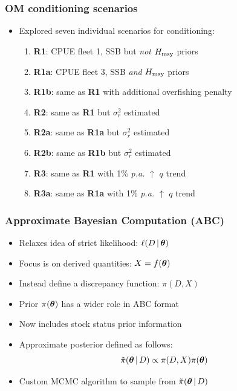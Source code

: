 \documentclass{beamer}
\newcommand{\ds}{\displaystyle}
\newcommand{\xtheta}{\mbox{\boldmath$\theta$}}
\newcommand{\sigr}{\sigma^2_r}
\newcommand{\hmsy}{H_{\rm msy}}
\begin{document}
\begin{frame}
\frametitle{OM conditioning scenarios}
\begin{itemize}
  \item Explored seven individual scenarios for conditioning:
  \vspace{0.25cm}
  \begin{enumerate}
      \item \textbf{R1}: CPUE fleet 1, SSB but \emph{not} $\hmsy$ priors
      \item \textbf{R1a}: CPUE fleet 3, SSB \emph{and} $\hmsy$ priors 
      \item \textbf{R1b}: same as \textbf{R1} with additional overfishing penalty
      \item \textbf{R2}: same as \textbf{R1} but $\sigr$ estimated
      \item \textbf{R2a}: same as \textbf{R1a} but $\sigr$ estimated 
      \item \textbf{R2b}: same as \textbf{R1b} but $\sigr$ estimated 
      \item \textbf{R3}: same as \textbf{R1} with 1\% \textit{p.a.} $\uparrow$ $q$ trend
      \item \textbf{R3a}: same as \textbf{R1a} with 1\% \textit{p.a.} $\uparrow$ $q$ trend
  \end{enumerate}
\end{itemize}
\end{frame}

\begin{frame}
    \frametitle{Approximate Bayesian Computation (ABC)}
\begin{itemize}
    \item Relaxes idea of strict likelihood: $\ell(D\,|\,\xtheta)$
    \item Focus is on derived quantities: $X=f(\xtheta)$
    \item Instead define a discrepancy function: $\pi(D,X)$
    \item Prior $\pi(\xtheta)$ has a wider role in ABC format
    \item Now includes stock status prior information
    \item Approximate posterior defined as follows:
        \begin{equation*}
            \ds \tilde\pi(\xtheta\,|\,D)\propto \pi(D,X)\pi(\xtheta)
        \end{equation*}
    \item Custom MCMC algorithm to sample from $\tilde\pi(\xtheta\,|\,D)$
\end{itemize}
\end{frame}
\end{document}
